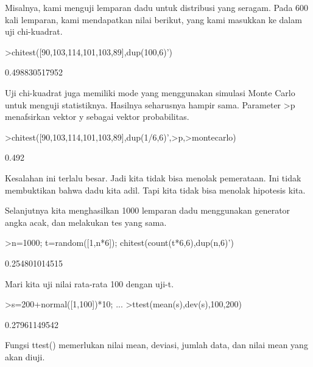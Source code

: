 \documentclass[a4paper,10pt]{article}
\begin{document}
\begin{eulernotebook}
\begin{eulercomment}
\begin{eulercomment}
\begin{eulercomment}
Misalnya, kami menguji lemparan dadu untuk distribusi yang seragam.
Pada 600 kali lemparan, kami mendapatkan nilai berikut, yang kami
masukkan ke dalam uji chi-kuadrat.
\end{eulercomment}
\begin{eulerprompt}
>chitest([90,103,114,101,103,89],dup(100,6)')
\end{eulerprompt}
\begin{euleroutput}
  0.498830517952
\end{euleroutput}
\begin{eulercomment}
Uji chi-kuadrat juga memiliki mode yang menggunakan simulasi Monte
Carlo untuk menguji statistiknya. Hasilnya seharusnya hampir sama.
Parameter \textgreater{}p menafsirkan vektor y sebagai vektor probabilitas.
\end{eulercomment}
\begin{eulerprompt}
>chitest([90,103,114,101,103,89],dup(1/6,6)',>p,>montecarlo)
\end{eulerprompt}
\begin{euleroutput}
  0.492
\end{euleroutput}
\begin{eulercomment}
Kesalahan ini terlalu besar. Jadi kita tidak bisa menolak pemerataan.
Ini tidak membuktikan bahwa dadu kita adil. Tapi kita tidak bisa
menolak hipotesis kita.

Selanjutnya kita menghasilkan 1000 lemparan dadu menggunakan generator
angka acak, dan melakukan tes yang sama.
\end{eulercomment}
\begin{eulerprompt}
>n=1000; t=random([1,n*6]); chitest(count(t*6,6),dup(n,6)')
\end{eulerprompt}
\begin{euleroutput}
  0.254801014515
\end{euleroutput}
\begin{eulercomment}
Mari kita uji nilai rata-rata 100 dengan uji-t.
\end{eulercomment}
\begin{eulerprompt}
>s=200+normal([1,100])*10; ...
>ttest(mean(s),dev(s),100,200)
\end{eulerprompt}
\begin{euleroutput}
  0.27961149542
\end{euleroutput}
\begin{eulercomment}
Fungsi ttest() memerlukan nilai mean, deviasi, jumlah data, dan nilai
mean yang akan diuji.


\end{eulercomment}
\end{eulercomment}
\end{eulercomment}
\end{eulernotebook}
\end{document}
